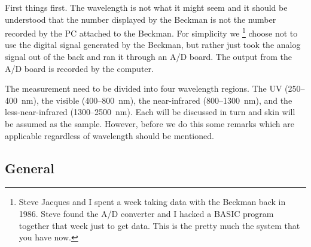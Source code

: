 \documentclass{article}
\begin{document}
First things first.  The wavelength is not what it might seem and
it should be understood that the number displayed by the Beckman is
not the number recorded by the PC attached to the Beckman.  For simplicity
we \footnote{Steve Jacques and I spent a week taking data with the 
Beckman back in 1986.  Steve found the A/D converter and I hacked a BASIC
program together that week just to get data.  This is the pretty much the
system that you have now.} choose not to use the digital signal generated by the Beckman, but
rather just took the analog signal out of the back and ran it through
an A/D board.  The output from the A/D board is recorded by the computer.

The measurement need to be divided into four wavelength regions. The UV (250--400~nm),
the visible (400--800~nm), the near-infrared (800--1300~nm), and the less-near-infrared
(1300--2500~nm).  Each will be discussed in turn and skin will be assumed as the
sample. However, before we do this some remarks which are applicable regardless of
wavelength should be mentioned.

\subsection*{General}
\end{document}
